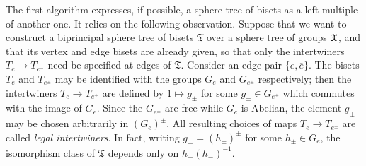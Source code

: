 \documentclass{amsart}
\begin{document}
The first algorithm expresses, if possible, a sphere tree of bisets as
a left multiple of another one. It relies on the following
observation. Suppose that we want to construct a biprincipal sphere
tree of bisets $\mathfrak T$ over a sphere tree of groups ${\mathfrak X}$, and
that its vertex and edge bisets are already given, so that only the
intertwiners $T_e\to T_{e^-}$ need be specified at edges of
$\mathfrak T$. Consider an edge pair $\{e,\overline e\}$. The bisets
$T_e$ and $T_{e^\pm}$ may be identified with the groups $G_e$ and
$G_{e^\pm}$ respectively; then the intertwiners $T_e\to T_{e^\pm}$ are
defined by $1\mapsto g_\pm$ for some $g_\pm\in G_{e^\pm}$ which
commutes with the image of $G_e$. Since the $G_{e^\pm}$ are free while
$G_e$ is Abelian, the element $g_\pm$ may be chosen arbitrarily in
$(G_e)^\pm$. All resulting choices of maps $T_e\to T_{e^\pm}$ are
called \emph{legal intertwiners}. In fact, writing $g_\pm=(h_\pm)^\pm$
for some $h_\pm\in G_e$, the isomorphism class of $\mathfrak T$
depends only on $h_+(h_-)^{-1}$.
\end{document}
